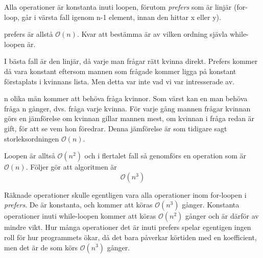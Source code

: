 \documentclass{article}
\newcommand{\Ordo}{\mathcal{O}}
\begin{document}
Alla operationer är konstanta inuti loopen, förutom \emph{prefers} som är linjär (for-loop, går i värsta fall igenom n-1 element, innan den hittar x eller y).

prefers är allstå $\Ordo(n)$. Kvar att bestämma är av vilken ordning sjävla while-loopen är.

I bästa fall är den linjär, då varje man frågar rätt kvinna direkt. Prefers kommer då vara konstant eftersom mannen som frågade kommer ligga på konstant förstaplats i kvinnans lista. Men detta var inte vad vi var intresserade av.

n olika män kommer att behöva fråga kvinnor. Som värst kan en man behöva fråga n gånger, dvs. fråga varje kvinna. För varje gång mannen frågar kvinnan görs en jämförelse om kvinnan gillar mannen mest, om kvinnan i fråga redan är gift, för att se vem hon föredrar. Denna jämförelse är som tidigare sagt storleksordningen $\Ordo(n)$.

Loopen är alltså $\Ordo(n^2)$ och i flertalet fall så genomförs en operation som är $\Ordo(n)$. Följer gör att algoritmen är $$\Ordo(n^3)$$

Räknade operationer skulle egentligen vara alla operationer inom for-loopen i \emph{prefers}. De är konstanta, och kommer att köras $\Ordo(n^3)$ gånger. Konstanta operationer inuti while-loopen kommer att köras $\Ordo(n^2)$ gånger och är därför av mindre vikt. Hur många operationer det är inuti prefers spelar egentigen ingen roll för hur programmets ökar, då det bara påverkar körtiden med en koefficient, men det är de som körs $\Ordo(n^3)$ gånger.
\end{document}

